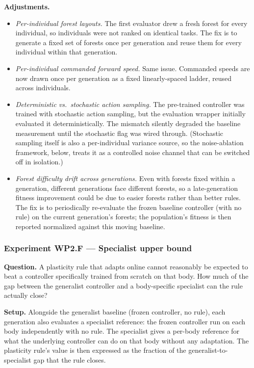 \documentclass[letterpaper,10pt]{article}
\begin{document}
\textbf{Adjustments.}
\begin{itemize}
    \item \emph{Per-individual forest layouts.} The first evaluator drew a fresh forest for every individual, so individuals were not ranked on identical tasks. The fix is to generate a fixed set of forests once per generation and reuse them for every individual within that generation.
    \item \emph{Per-individual commanded forward speed.} Same issue. Commanded speeds are now drawn once per generation as a fixed linearly-spaced ladder, reused across individuals.
    \item \emph{Deterministic vs.\ stochastic action sampling.} The pre-trained controller was trained with stochastic action sampling, but the evaluation wrapper initially evaluated it deterministically. The mismatch silently degraded the baseline measurement until the stochastic flag was wired through. (Stochastic sampling itself is also a per-individual variance source, so the noise-ablation framework, below, treats it as a controlled noise channel that can be switched off in isolation.)
    \item \emph{Forest difficulty drift across generations.} Even with forests fixed within a generation, different generations face different forests, so a late-generation fitness improvement could be due to easier forests rather than better rules. The fix is to periodically re-evaluate the frozen baseline controller (with no rule) on the current generation's forests; the population's fitness is then reported normalized against this moving baseline.
\end{itemize}

\subsubsection{Experiment WP2.F --- Specialist upper bound}
\textbf{Question.} A plasticity rule that adapts online cannot reasonably be expected to beat a controller specifically trained from scratch on that body. How much of the gap between the generalist controller and a body-specific specialist can the rule actually close?

\textbf{Setup.} Alongside the generalist baseline (frozen controller, no rule), each generation also evaluates a specialist reference: the frozen controller run on each body independently with no rule. The specialist gives a per-body reference for what the underlying controller can do on that body without any adaptation. The plasticity rule's value is then expressed as the fraction of the generalist-to-specialist gap that the rule closes.
\end{document}
